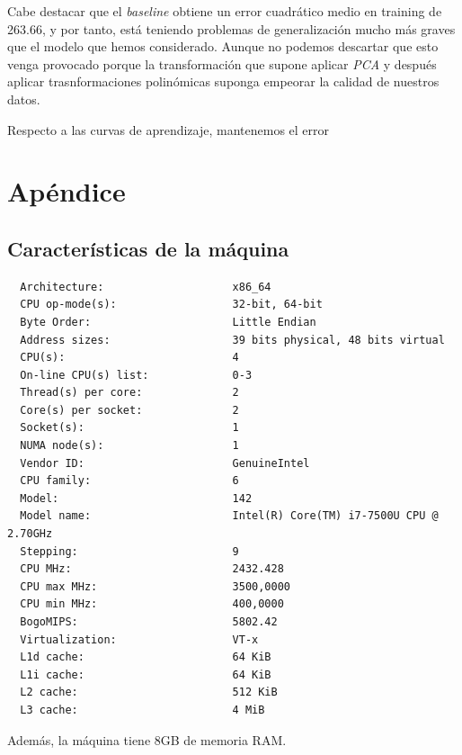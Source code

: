 \documentclass[11pt]{article}
\begin{document}
Cabe destacar que el \emph{baseline}  obtiene un error cuadrático medio en training de 263.66, y por tanto, está teniendo problemas de generalización mucho más graves que el modelo que hemos considerado. Aunque no podemos descartar que esto venga provocado porque la transformación que supone aplicar \emph{PCA} y después aplicar trasnformaciones polinómicas suponga empeorar la calidad de nuestros datos.

Respecto a las curvas de aprendizaje, mantenemos el error %


\pagebreak
\section{Apéndice} \label{apendice}

\subsection{Características de la máquina}

\begin{lstlisting}
  Architecture:                    x86_64
  CPU op-mode(s):                  32-bit, 64-bit
  Byte Order:                      Little Endian
  Address sizes:                   39 bits physical, 48 bits virtual
  CPU(s):                          4
  On-line CPU(s) list:             0-3
  Thread(s) per core:              2
  Core(s) per socket:              2
  Socket(s):                       1
  NUMA node(s):                    1
  Vendor ID:                       GenuineIntel
  CPU family:                      6
  Model:                           142
  Model name:                      Intel(R) Core(TM) i7-7500U CPU @ 2.70GHz
  Stepping:                        9
  CPU MHz:                         2432.428
  CPU max MHz:                     3500,0000
  CPU min MHz:                     400,0000
  BogoMIPS:                        5802.42
  Virtualization:                  VT-x
  L1d cache:                       64 KiB
  L1i cache:                       64 KiB
  L2 cache:                        512 KiB
  L3 cache:                        4 MiB
  \end{lstlisting}

Además, la máquina tiene 8GB de memoria RAM.

\pagebreak


\end{document}
